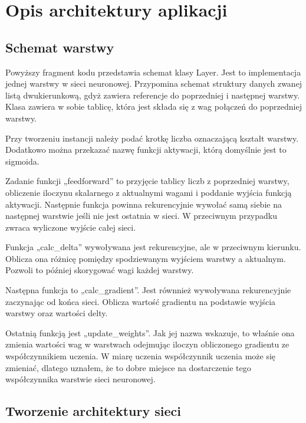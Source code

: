     \chapter{Opis architektury aplikacji}\label{ch:opisArchitekturyAplikacji}

    \section{Schemat warstwy}\label{sec:schematWarstwy}


    Powyższy fragment kodu przedstawia schemat klasy Layer.
    Jest to implementacja jednej warstwy w sieci neuronowej.
    Przypomina schemat struktury danych zwanej listą dwukierunkową, gdyż zawiera referencje do poprzedniej i następnej warstwy.
    Klasa zawiera w sobie tablicę, która jest składa się z wag połączeń do poprzedniej warstwy.

    Przy tworzeniu instancji należy podać krotkę liczba oznaczającą kształt warstwy.
    Dodatkowo można przekazać nazwę funkcji aktywacji, którą domyślnie jest to sigmoida.

    Zadanie funkcji „feedforward” to przyjęcie tablicy liczb z poprzedniej warstwy, obliczenie iloczynu skalarnego z aktualnymi wagami i poddanie wyjścia funkcją aktywacji.
    Następnie funkcja powinna rekurencyjnie wywołać samą siebie na następnej warstwie jeśli nie jest ostatnia w sieci.
    W przeciwnym przypadku zwraca wyliczone wyjście całej sieci.

    Funkcja „calc\_delta” wywoływana jest rekurencyjne, ale w przeciwnym kierunku.
    Oblicza ona różnicę pomiędzy spodziewanym wyjściem warstwy a aktualnym.
    Pozwoli to później skorygować wagi każdej warstwy.

    Następna funkcja to „calc\_gradient”.
    Jest równnież wywoływana rekurencyjnie zaczynając od końca sieci.
    Oblicza wartość gradientu na podstawie wyjścia warstwy oraz wartości delty.

    Ostatnią funkcją jest „update\_weights”.
    Jak jej nazwa wskazuje, to właśnie ona zmienia wartości wag w warstwach odejmując iloczyn obliczonego gradientu ze współczynnikiem uczenia.
    W miarę uczenia współczynnik uczenia może się zmieniać, dlatego uznałem, że to dobre miejsce na dostarczenie tego współczynnika warstwie sieci neuronowej.

    \section{Tworzenie architektury sieci}\label{sec:tworzenieArchitekturySieci}


